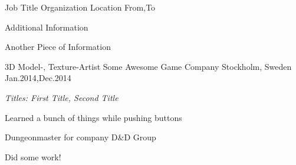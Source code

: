 \begin{section}[Work]
  \entry%
    {Job Title} %
    {Organization} %
    {Location} %
    {From,To} %
    {%
      \begin{entrylist}
        \item Additional Information
        \item Another Piece of Information
      \end{entrylist}%
    }%

  \entry%
    {3D Model-, Texture-Artist} %
    {Some Awesome Game Company} %
    {Stockholm, Sweden} %
    {Jan.2014,Dec.2014} %
    {%
      \textit{Titles: First Title, Second Title}
      \begin{entrylist}
        \item Learned a bunch of things while pushing buttons
        \item Dungeonmaster for company D\&D Group
        \item Did some work!
      \end{entrylist}%
    }%
\end{section}

